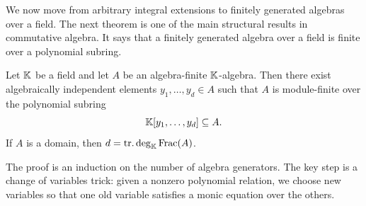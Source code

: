 \documentclass[12pt,reqno]{amsart}
\begin{document}
\hrulefill

We now move from arbitrary integral extensions to finitely generated algebras over a field. The next theorem is one of the main structural results in commutative algebra. It says that a finitely generated algebra over a field is finite over a polynomial subring.

\begin{theorem}
Let $\mathbb{K}$ be a field and let $A$ be an algebra-finite $\mathbb{K}$-algebra. Then there exist algebraically independent elements $y_1,\ldots,y_d\in A$ such that $A$ is module-finite over the polynomial subring
\[
\mathbb{K}[y_1,\ldots,y_d]\subseteq A.
\]
If $A$ is a domain, then $d=\operatorname{tr.deg}_{\mathbb{K}}\operatorname{Frac}(A)$.
\end{theorem}

The proof is an induction on the number of algebra generators. The key step is a change of variables trick: given a nonzero polynomial relation, we choose new variables so that one old variable satisfies a monic equation over the others.

\hrulefill
\end{document}
